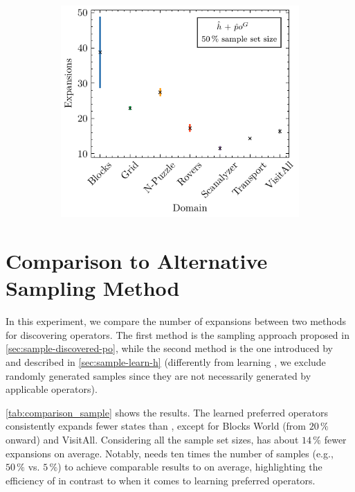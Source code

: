 \documentclass[ppgc,diss,english]{iiufrgs}
\begin{document}
\begin{figure}[tb]
  \vspace{0.5cm}

  \begin{subfigure}{0.41\textwidth}
    \centering
    \includegraphics[width=\linewidth]{img/error_hNN_poG_50pct.pdf}
  \end{subfigure}
  \label{fig:errors}
\end{figure}


\section{Comparison to Alternative Sampling Method}
\label{sec:exp-comparison-sample-method}
In this experiment, we compare the number of expansions between two methods for discovering operators. The first method is the sampling approach proposed in \cref{sec:sample-discovered-po}, while the second method is the one introduced by~\citet{Bettker.etal/2022} and described in \cref{sec:sample-learn-h} (differently from learning \hnn, we exclude randomly generated samples since they are not necessarily generated by applicable operators).

\cref{tab:comparison_sample} shows the results. The learned preferred operators \pog consistently expands fewer states than \pofsm, except for Blocks World (from $20\,\%$ onward) and VisitAll. Considering all the sample set sizes, \pog has about $14\,\%$ fewer expansions on average. Notably, \pofsm needs ten times the number of samples (e.g., $50\,\%$ vs. $5\,\%$) to achieve comparable results to \pog on average, highlighting the efficiency of \bfsrs in contrast to \bfsrw when it comes to learning preferred operators.
\end{document}
